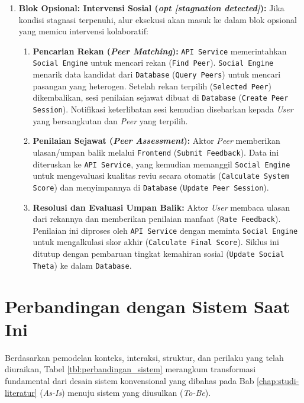 \begin{enumerate}
    \item \textbf{Blok Opsional: Intervensi Sosial (\textit{opt [stagnation detected]}):}
    Jika kondisi stagnasi terpenuhi, alur eksekusi akan masuk ke dalam blok opsional yang memicu intervensi kolaboratif:
    \begin{enumerate}
        \item \textbf{Pencarian Rekan (\textit{Peer Matching}):} \texttt{API Service} memerintahkan \texttt{Social Engine} untuk mencari rekan (\texttt{Find Peer}). \texttt{Social Engine} menarik data kandidat dari \texttt{Database} (\texttt{Query Peers}) untuk mencari pasangan yang heterogen. Setelah rekan terpilih (\texttt{Selected Peer}) dikembalikan, sesi penilaian sejawat dibuat di \texttt{Database} (\texttt{Create Peer Session}). Notifikasi keterlibatan sesi kemudian disebarkan kepada \textit{User} yang bersangkutan dan \textit{Peer} yang terpilih.
        \item \textbf{Penilaian Sejawat (\textit{Peer Assessment}):} Aktor \textit{Peer} memberikan ulasan/umpan balik melalui \texttt{Frontend} (\texttt{Submit Feedback}). Data ini diteruskan ke \texttt{API Service}, yang kemudian memanggil \texttt{Social Engine} untuk mengevaluasi kualitas reviu secara otomatis (\texttt{Calculate System Score}) dan menyimpannya di \texttt{Database} (\texttt{Update Peer Session}).
        \item \textbf{Resolusi dan Evaluasi Umpan Balik:} Aktor \textit{User} membaca ulasan dari rekannya dan memberikan penilaian manfaat (\texttt{Rate Feedback}). Penilaian ini diproses oleh \texttt{API Service} dengan meminta \texttt{Social Engine} untuk mengalkulasi skor akhir (\texttt{Calculate Final Score}). Siklus ini ditutup dengan pembaruan tingkat kemahiran sosial (\texttt{Update Social Theta}) ke dalam \texttt{Database}.
    \end{enumerate}
\end{enumerate}

\section{Perbandingan dengan Sistem Saat Ini}
\label{sec:perbandingan}

Berdasarkan pemodelan konteks, interaksi, struktur, dan perilaku yang telah diuraikan, Tabel \ref{tbl:perbandingan_sistem} merangkum transformasi fundamental dari desain sistem konvensional yang dibahas pada Bab \ref{chap:studi-literatur} (\textit{As-Is}) menuju sistem yang diusulkan (\textit{To-Be}).


